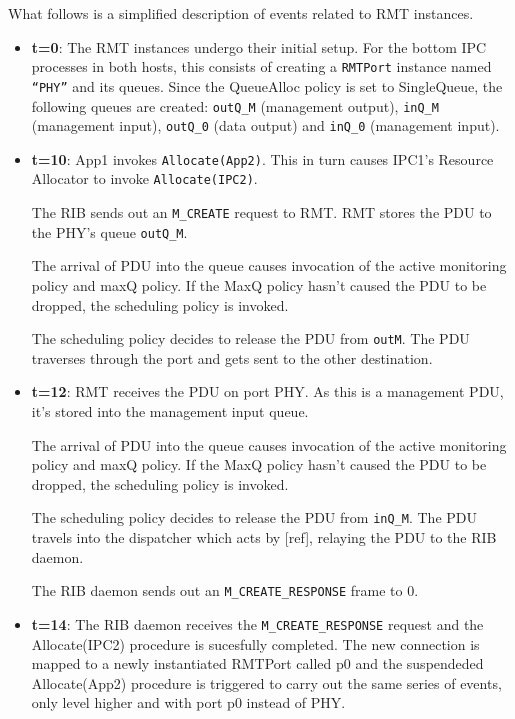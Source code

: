             What follows is a simplified description of events related to RMT instances.

            \begin{itemize}
            \item \textbf{t=0}: The RMT instances undergo their initial setup. For the bottom IPC processes in both hosts, this consists of creating a \texttt{RMTPort} instance named \texttt{``PHY''} and its queues. Since the QueueAlloc policy is set to SingleQueue, the following queues are created: \texttt{outQ\_M} (management output), \texttt{inQ\_M} (management input), \texttt{outQ\_0} (data output) and \texttt{inQ\_0} (management input).

            \item \textbf{t=10}: App1 invokes \texttt{Allocate(App2)}. This in turn causes IPC1's Resource Allocator to invoke \texttt{Allocate(IPC2)}.

                The RIB sends out an \texttt{M\_CREATE} request to RMT. RMT stores the PDU to the PHY's queue \texttt{outQ\_M}.

                The arrival of PDU into the queue causes invocation of the active monitoring policy and maxQ policy. If the MaxQ policy hasn't caused the PDU to be dropped, the scheduling policy is invoked.

                The scheduling policy decides to release the PDU from \texttt{outM}. The PDU traverses through the port and gets sent to the other destination.

            \item \textbf{t=12}: RMT receives the PDU on port PHY. As this is a management PDU, it's stored into the management input queue.

                The arrival of PDU into the queue causes invocation of the active monitoring policy and maxQ policy. If the MaxQ policy hasn't caused the PDU to be dropped, the scheduling policy is invoked.

                The scheduling policy decides to release the PDU from \texttt{inQ\_M}. The PDU travels into the dispatcher which acts by [ref], relaying the PDU to the RIB daemon.

                The RIB daemon sends out an \texttt{M\_CREATE\_RESPONSE} frame to 0.

            \item \textbf{t=14}: The RIB daemon receives the \texttt{M\_CREATE\_RESPONSE} request and the Allocate(IPC2) procedure is sucesfully completed. The new connection is mapped to a newly instantiated RMTPort called p0 and the suspendeded Allocate(App2) procedure is triggered to carry out the same series of events, only level higher and with port p0 instead of PHY.


\end{itemize}
